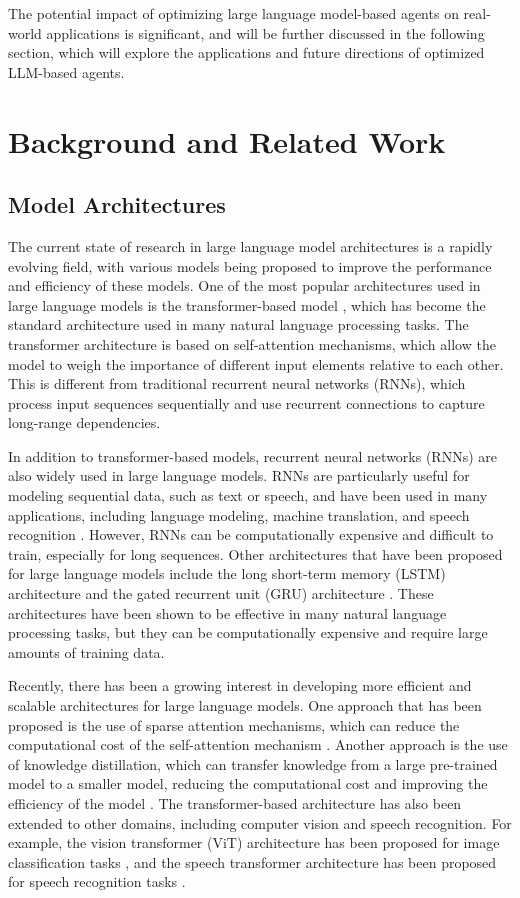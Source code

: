 \documentclass[11pt]{article}
\begin{document}
The potential impact of optimizing large language model-based agents on real-world applications is significant, and will be further discussed in the following section, which will explore the applications and future directions of optimized LLM-based agents.

\section{Background and Related Work}

\subsection{Model Architectures}

The current state of research in large language model architectures is a rapidly evolving field, with various models being proposed to improve the performance and efficiency of these models. One of the most popular architectures used in large language models is the transformer-based model \cite{ref55}, which has become the standard architecture used in many natural language processing tasks. The transformer architecture is based on self-attention mechanisms, which allow the model to weigh the importance of different input elements relative to each other. This is different from traditional recurrent neural networks (RNNs), which process input sequences sequentially and use recurrent connections to capture long-range dependencies.

In addition to transformer-based models, recurrent neural networks (RNNs) are also widely used in large language models. RNNs are particularly useful for modeling sequential data, such as text or speech, and have been used in many applications, including language modeling, machine translation, and speech recognition \cite{ref56}. However, RNNs can be computationally expensive and difficult to train, especially for long sequences. Other architectures that have been proposed for large language models include the long short-term memory (LSTM) architecture \cite{ref57} and the gated recurrent unit (GRU) architecture \cite{ref58}. These architectures have been shown to be effective in many natural language processing tasks, but they can be computationally expensive and require large amounts of training data.

Recently, there has been a growing interest in developing more efficient and scalable architectures for large language models. One approach that has been proposed is the use of sparse attention mechanisms, which can reduce the computational cost of the self-attention mechanism \cite{ref59}. Another approach is the use of knowledge distillation, which can transfer knowledge from a large pre-trained model to a smaller model, reducing the computational cost and improving the efficiency of the model \cite{ref60}. The transformer-based architecture has also been extended to other domains, including computer vision and speech recognition. For example, the vision transformer (ViT) architecture has been proposed for image classification tasks \cite{ref61}, and the speech transformer architecture has been proposed for speech recognition tasks \cite{ref62}.
\end{document}
